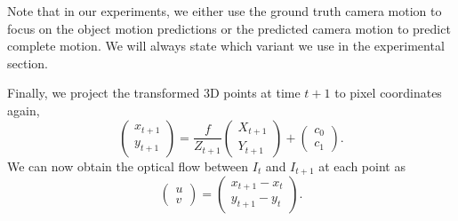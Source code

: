 Note that in our experiments, we either use the ground truth camera motion to focus
on the object motion predictions or the predicted camera motion to predict complete
motion. We will always state which variant we use in the experimental section.

Finally, we project the transformed 3D points at time $t+1$ to pixel coordinates again,
\begin{equation}
\begin{pmatrix}
x_{t+1} \\ y_{t+1}
\end{pmatrix}
=
\frac{f}{Z_{t+1}}
\begin{pmatrix}
X_{t+1} \\ Y_{t+1}
\end{pmatrix}
+
\begin{pmatrix}
c_0 \\ c_1
\end{pmatrix}.
\end{equation}
We can now obtain the optical flow between $I_t$ and $I_{t+1}$ at each point as
\begin{equation}
\begin{pmatrix}
u \\ v
\end{pmatrix}
=
\begin{pmatrix}
x_{t+1} - x_{t} \\ y_{t+1} - y_{t}
\end{pmatrix}.
\end{equation}
